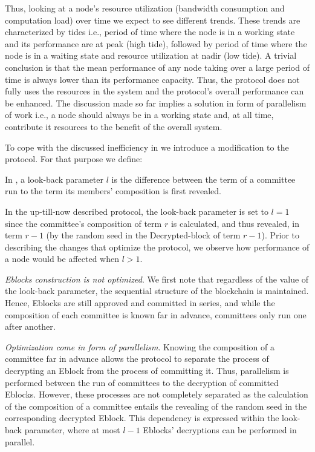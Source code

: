 Thus, looking at a node’s resource utilization (bandwidth consumption and computation load) over time we expect to see different trends. These trends are characterized by tides i.e., period of time where the node is in a working state and its performance are at peak (high tide), followed by period of time where the node is in a waiting state and resource utilization at nadir (low tide). A trivial conclusion is that the mean performance of any node taking over a large period of time is always lower than its performance capacity. Thus, the protocol does not fully uses the resources in the system and the protocol’s overall performance can be enhanced. The discussion made so far implies a solution in form of parallelism of work i.e., a node should always be in a working state and, at all time, contribute it resources to the benefit of the overall system.
 
To cope with the discussed inefficiency in \name we introduce a modification to the protocol. For that purpose we define:
\begin{definition} 
In \nameNS, a look-back parameter $l$ is the difference between the term of a committee run to the term its members’ composition is first revealed.
\end{definition}

In the up-till-now described protocol, the look-back parameter is set to $l=1$ since the committee’s composition of term $r$ is calculated, and thus revealed, in term $r-1$ (by the random seed in the Decrypted-block of term $r-1$).
Prior to describing the changes that optimize the protocol, we observe how performance of a node would be affected when $l>1$. 

\textit{Eblocks construction is not optimized}. We first note that regardless of the value of the look-back parameter, the sequential structure of the blockchain is maintained. Hence, Eblocks are still approved and committed in series, and while the composition of each committee is known far in advance, committees only run one after another. 

\textit{Optimization come in form of parallelism}. Knowing the composition of a committee far in advance allows the protocol to separate the process of decrypting an Eblock from the process of committing it. Thus, parallelism is performed between the run of committees to the decryption of committed Eblocks. However, these processes are not completely separated as the calculation of the composition of a committee entails the revealing of the random seed in the corresponding decrypted Eblock. This dependency is expressed within the look-back parameter, where at most $l-1$ Eblocks’ decryptions can be performed in parallel.

